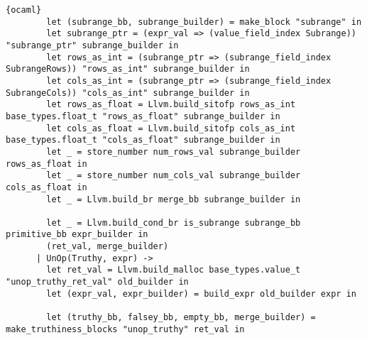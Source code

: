 \begin{lstlisting}{ocaml}
        let (subrange_bb, subrange_builder) = make_block "subrange" in
        let subrange_ptr = (expr_val => (value_field_index Subrange)) "subrange_ptr" subrange_builder in
        let rows_as_int = (subrange_ptr => (subrange_field_index SubrangeRows)) "rows_as_int" subrange_builder in
        let cols_as_int = (subrange_ptr => (subrange_field_index SubrangeCols)) "cols_as_int" subrange_builder in
        let rows_as_float = Llvm.build_sitofp rows_as_int base_types.float_t "rows_as_float" subrange_builder in
        let cols_as_float = Llvm.build_sitofp cols_as_int base_types.float_t "cols_as_float" subrange_builder in
        let _ = store_number num_rows_val subrange_builder rows_as_float in
        let _ = store_number num_cols_val subrange_builder cols_as_float in
        let _ = Llvm.build_br merge_bb subrange_builder in

        let _ = Llvm.build_cond_br is_subrange subrange_bb primitive_bb expr_builder in
        (ret_val, merge_builder)
      | UnOp(Truthy, expr) ->
        let ret_val = Llvm.build_malloc base_types.value_t "unop_truthy_ret_val" old_builder in
        let (expr_val, expr_builder) = build_expr old_builder expr in

        let (truthy_bb, falsey_bb, empty_bb, merge_builder) = make_truthiness_blocks "unop_truthy" ret_val in


\end{lstlisting}
